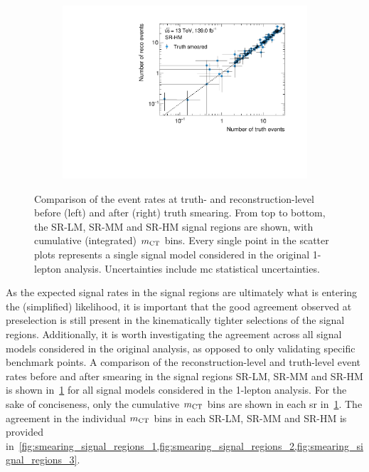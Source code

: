 \begin{figure}
\begin{subfigure}[b]{0.49\linewidth}
	\end{subfigure}\hfill
	\begin{subfigure}[b]{0.49\linewidth}
		\centering\includegraphics[width=\textwidth]{yields_SR-HM_smeared}
	\end{subfigure}
	\caption{Comparison of the event rates at truth- and reconstruction-level before (left) and after (right) truth smearing. From top to bottom, the SR-LM, SR-MM and SR-HM signal regions are shown, with cumulative (integrated) $m_{\textrm{CT}}$ bins. Every single point in the scatter plots represents a single signal model considered in the original 1-lepton analysis. Uncertainties include \gls{mc} statistical uncertainties.}
	\label{fig:smearing_signal_regions}
\end{figure}
 
 As the expected signal rates in the signal regions are ultimately what is entering the (simplified) likelihood, it is important that the good agreement observed at preselection is still present in the kinematically tighter selections of the signal regions. Additionally, it is worth investigating the agreement across all signal models considered in the original analysis, as opposed to only validating specific benchmark points. A comparison of the reconstruction-level and truth-level event rates before and after smearing in the signal regions SR-LM, SR-MM and SR-HM is shown in~\cref{fig:smearing_signal_regions} for all signal models considered in the 1-lepton analysis. For the sake of conciseness, only the cumulative $m_{\textrm{CT}}$ bins are shown in each \gls{sr} in~\cref{fig:smearing_signal_regions}. The agreement in the individual $m_{\textrm{CT}}$ bins in each SR-LM, SR-MM and SR-HM is provided in~\cref{fig:smearing_signal_regions_1,fig:smearing_signal_regions_2,fig:smearing_signal_regions_3}.
 
